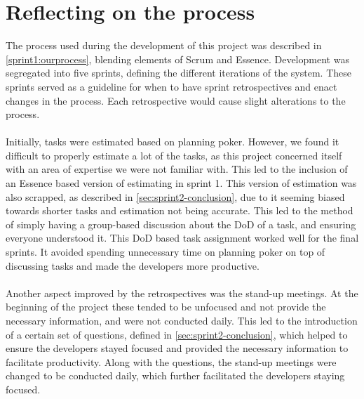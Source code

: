 \section{Reflecting on the process}
The process used during the development of this project was described in \autoref{sprint1:ourprocess}, blending elements of Scrum and Essence.
Development was segregated into five sprints, defining the different iterations of the system.
These sprints served as a guideline for when to have sprint retrospectives and enact changes in the process.
Each retrospective would cause slight alterations to the process.
\\\\
Initially, tasks were estimated based on planning poker.
However, we found it difficult to properly estimate a lot of the tasks, as this project concerned itself with an area of expertise we were not familiar with.
This led to the inclusion of an Essence based version of estimating in sprint 1.
This version of estimation was also scrapped, as described in \autoref{sec:sprint2-conclusion}, due to it seeming biased towards shorter tasks and estimation not being accurate.
This led to the method of simply having a group-based discussion about the DoD of a task, and ensuring everyone understood it.
This DoD based task assignment worked well for the final sprints.
It avoided spending unnecessary time on planning poker on top of discussing tasks and made the developers more productive.
\\\\
Another aspect improved by the retrospectives was the stand-up meetings.
At the beginning of the project these tended to be unfocused and not provide the necessary information, and were not conducted daily.
This led to the introduction of a certain set of questions, defined in \autoref{sec:sprint2-conclusion}, which helped to ensure the developers stayed focused and provided the necessary information to facilitate productivity.
Along with the questions, the stand-up meetings were changed to be conducted daily, which further facilitated the developers staying focused.
\\\\
